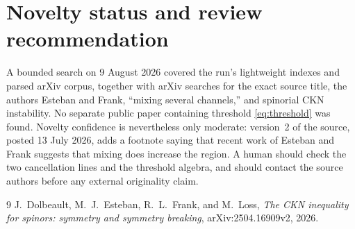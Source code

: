 \documentclass[11pt]{article}
\begin{document}
\section{Novelty status and review recommendation}

A bounded search on 9 August 2026 covered the run's lightweight indexes and
parsed arXiv corpus, together with arXiv searches for the exact source title,
the authors Esteban and Frank, ``mixing several channels,'' and spinorial CKN
instability.  No separate public paper containing threshold
\eqref{eq:threshold} was found.  Novelty confidence is nevertheless only
moderate: version~2 of the source, posted 13 July 2026, adds a footnote saying
that recent work of Esteban and Frank suggests that mixing does increase the
region.  A human should check the two cancellation lines and the threshold
algebra, and should contact the source authors before any external originality
claim.

\begin{thebibliography}{9}
J.~Dolbeault, M.~J.~Esteban, R.~L.~Frank, and M.~Loss,
\emph{The CKN inequality for spinors: symmetry and symmetry breaking},
arXiv:2504.16909v2, 2026.
\end{thebibliography}
\end{document}
